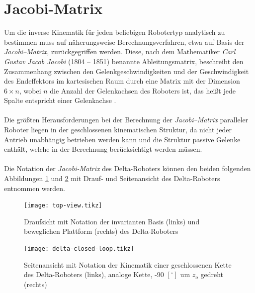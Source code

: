 \documentclass[Bachelor, BMR, ngerman]{twbook}
\begin{document}
    \section{Jacobi-Matrix}
    \label{cap:jacobi}
    
    Um die inverse Kinematik für jeden beliebigen Robotertyp analytisch zu bestimmen muss auf näherungsweise Berechnungsverfahren, etwa auf Basis der \textit{Jacobi–Matrix}, zurückgegriffen werden. Diese, nach dem Mathematiker \textit{Carl Gustav Jacob Jacobi} (1804 – 1851) benannte Ableitungsmatrix, beschreibt den Zusammenhang zwischen den Gelenkgeschwindigkeiten und der Geschwindigkeit des Endeffektors im kartesischen Raum durch eine Matrix mit der Dimension $6 \times n$, wobei $n$ die Anzahl der Gelenkachsen des Roboters ist, das heißt jede Spalte entspricht einer Gelenkachse \cite{We08}.\\
    \\
    Die größten Herausforderungen bei der Berechnung der \textit{Jacobi–Matrix} paralleler Roboter liegen in der geschlossenen kinematischen Struktur, da nicht jeder Antrieb unabhängig betrieben werden kann und die Struktur passive Gelenke enthält, welche in der Berechnung berücksichtigt werden müssen.\\
    \\
    Die Notation der \textit{Jacobi-Matrix} des Delta-Roboters können den beiden folgenden Abbildungen \ref{fig:top-view-jacobi} und \ref{fig:delta-closed-loop-jacobi} mit Drauf- und Seitenansicht des Delta-Roboters entnommen werden.
    \begin{figure}[H]
        \centering
        {
            \texttt{[image: top-view.tikz]}
        }
        \caption[Draufsicht mit Notation der invarianten Basis (links) und beweglichen Plattform (rechts) des Delta-Roboters]{Draufsicht mit Notation der invarianten Basis (links) und beweglichen Plattform (rechts) des Delta-Roboters}
        \label{fig:top-view-jacobi}
    \end{figure}
    \noindent
    \begin{figure}[H]
        \centering
        {
            \texttt{[image: delta-closed-loop.tikz]}
        }
        \caption[{Seitenansicht mit Notation der Kinematik einer geschlossenen Kette des Delta-Roboters (links), analoge Kette, -90 $[^{\circ}]$ um $z_o$ gedreht (rechts)}]{Seitenansicht mit Notation der Kinematik einer geschlossenen Kette des Delta-Roboters (links), analoge Kette, -90 $[^{\circ}]$ um $z_o$ gedreht (rechts)}
        \label{fig:delta-closed-loop-jacobi}
    \end{figure}
\end{document}
